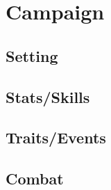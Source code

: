 
\chapter{Campaign}

\section{Setting}


\section{Stats/Skills}


\section{Traits/Events}


\section{Combat}

